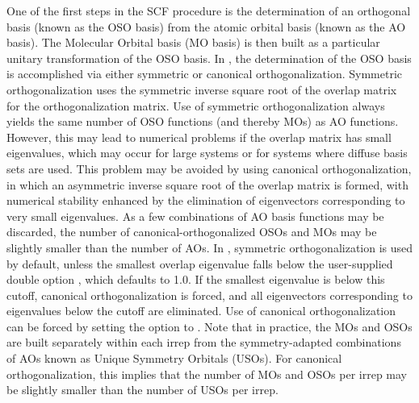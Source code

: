 One of the first steps in the SCF procedure is the determination of an
orthogonal basis (known as the OSO basis) from the atomic orbital basis (known
as the AO basis). The Molecular Orbital basis (MO basis) is then built as a
particular unitary transformation of the OSO basis. In \PSIfour, the
determination of the OSO basis is accomplished via either symmetric or
canonical orthogonalization. Symmetric orthogonalization uses the symmetric
inverse square root of the overlap matrix for the orthogonalization matrix. Use
of symmetric orthogonalization always yields the same number of OSO functions
(and thereby MOs) as AO functions. However, this may lead to numerical problems
if the overlap matrix has small eigenvalues, which may occur for large systems
or for systems where diffuse basis sets are used. This problem may be avoided by
using canonical orthogonalization, in which an asymmetric inverse square root of
the overlap matrix is formed, with numerical stability enhanced by the
elimination of eigenvectors corresponding to very small eigenvalues. As a few
combinations of AO basis functions may be discarded, the number of
canonical-orthogonalized OSOs and MOs may be slightly smaller than the number of
AOs. In \PSIfour, symmetric orthogonalization is used by default, unless the
smallest overlap eigenvalue falls below the user-supplied double option
, which defaults to 1.0. If the smallest
eigenvalue is below this cutoff, canonical orthogonalization is forced, and all
eigenvectors corresponding to eigenvalues below the cutoff are eliminated.
Use of canonical orthogonalization can be forced by setting the
 option to . Note that in
practice, the MOs and OSOs are built separately within each irrep from the
symmetry-adapted combinations of AOs known as Unique Symmetry Orbitals (USOs).
For canonical orthogonalization, this implies that the number of MOs and OSOs
per irrep may be slightly smaller than the number of USOs per irrep.

